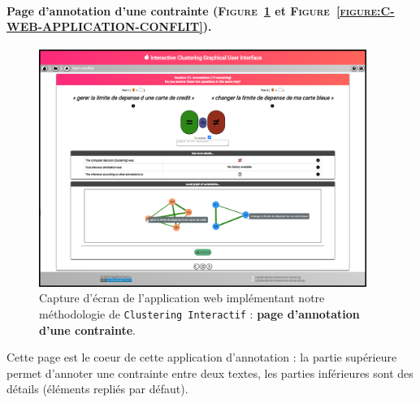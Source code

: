 	
		\paragraph{Page d'annotation d'une contrainte (\textsc{Figure~\ref{figure:C-WEB-APPLICATION-ANNOTATION}} et \textsc{Figure~\ref{figure:C-WEB-APPLICATION-CONFLIT}}).}
		
			\begin{figure}[H]
				\centering
				\includegraphics[width=0.95\textwidth]{figures/interactive-clustering-application-annotation-0full}
				\caption{
					Capture d'écran de l'application web implémentant notre méthodologie de \texttt{Clustering Interactif} : \textbf{page d'annotation d'une contrainte}.
				}
				\label{figure:C-WEB-APPLICATION-ANNOTATION}
			\end{figure}
			
			Cette page est le coeur de cette application d'annotation : la partie supérieure permet d'annoter une contrainte entre deux textes, les parties inférieures sont des détails (éléments repliés par défaut).
			
